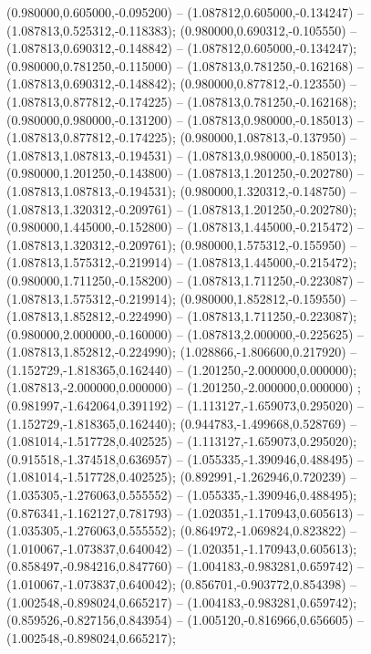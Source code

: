  (0.980000,0.605000,-0.095200) -- (1.087812,0.605000,-0.134247) -- (1.087813,0.525312,-0.118383);
 (0.980000,0.690312,-0.105550) -- (1.087813,0.690312,-0.148842) -- (1.087812,0.605000,-0.134247);
 (0.980000,0.781250,-0.115000) -- (1.087813,0.781250,-0.162168) -- (1.087813,0.690312,-0.148842);
 (0.980000,0.877812,-0.123550) -- (1.087813,0.877812,-0.174225) -- (1.087813,0.781250,-0.162168);
 (0.980000,0.980000,-0.131200) -- (1.087813,0.980000,-0.185013) -- (1.087813,0.877812,-0.174225);
 (0.980000,1.087813,-0.137950) -- (1.087813,1.087813,-0.194531) -- (1.087813,0.980000,-0.185013);
 (0.980000,1.201250,-0.143800) -- (1.087813,1.201250,-0.202780) -- (1.087813,1.087813,-0.194531);
 (0.980000,1.320312,-0.148750) -- (1.087813,1.320312,-0.209761) -- (1.087813,1.201250,-0.202780);
 (0.980000,1.445000,-0.152800) -- (1.087813,1.445000,-0.215472) -- (1.087813,1.320312,-0.209761);
 (0.980000,1.575312,-0.155950) -- (1.087813,1.575312,-0.219914) -- (1.087813,1.445000,-0.215472);
 (0.980000,1.711250,-0.158200) -- (1.087813,1.711250,-0.223087) -- (1.087813,1.575312,-0.219914);
 (0.980000,1.852812,-0.159550) -- (1.087813,1.852812,-0.224990) -- (1.087813,1.711250,-0.223087);
 (0.980000,2.000000,-0.160000) -- (1.087813,2.000000,-0.225625) -- (1.087813,1.852812,-0.224990);
 (1.028866,-1.806600,0.217920) -- (1.152729,-1.818365,0.162440) -- (1.201250,-2.000000,0.000000);
 (1.087813,-2.000000,0.000000) -- (1.201250,-2.000000,0.000000) ;
 (0.981997,-1.642064,0.391192) -- (1.113127,-1.659073,0.295020) -- (1.152729,-1.818365,0.162440);
 (0.944783,-1.499668,0.528769) -- (1.081014,-1.517728,0.402525) -- (1.113127,-1.659073,0.295020);
 (0.915518,-1.374518,0.636957) -- (1.055335,-1.390946,0.488495) -- (1.081014,-1.517728,0.402525);
 (0.892991,-1.262946,0.720239) -- (1.035305,-1.276063,0.555552) -- (1.055335,-1.390946,0.488495);
 (0.876341,-1.162127,0.781793) -- (1.020351,-1.170943,0.605613) -- (1.035305,-1.276063,0.555552);
 (0.864972,-1.069824,0.823822) -- (1.010067,-1.073837,0.640042) -- (1.020351,-1.170943,0.605613);
 (0.858497,-0.984216,0.847760) -- (1.004183,-0.983281,0.659742) -- (1.010067,-1.073837,0.640042);
 (0.856701,-0.903772,0.854398) -- (1.002548,-0.898024,0.665217) -- (1.004183,-0.983281,0.659742);
 (0.859526,-0.827156,0.843954) -- (1.005120,-0.816966,0.656605) -- (1.002548,-0.898024,0.665217);
